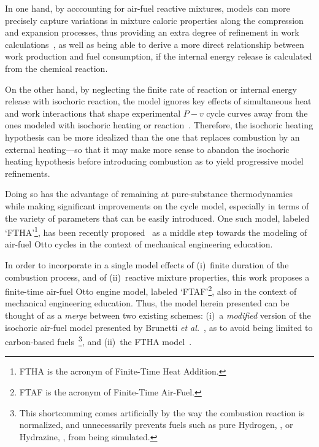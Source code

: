     In one hand, by acccounting for air-fuel reactive mixtures, models can more precisely capture variations in mixture  caloric
    properties along  the  compression  and  expansion  processes,  thus  providing  an  extra  degree  of  refinement  in  work
    calculations~\cite{2012-BrunettiF-Blucher}, as well as being  able  to  derive  a  more  direct  relationship  between  work
    production and fuel consumption, if the internal energy release is calculated from the chemical reaction.

    On the other hand, by neglecting the finite rate of reaction or internal energy release with isochoric reaction,  the  model
    ignores key effects of simultaneous heat and work interactions that shape experimental $P-v$ cycle curves away from the ones
    modeled with isochoric heating or reaction~\cite{2013-MartinsJJG-Publindustria}. Therefore, the isochoric heating hypothesis
    can be more idealized than the one that replaces combustion by an external heating---so that  it  may  make  more  sense  to
    abandon the isochoric heating hypothesis before introducing combustion as to yield progressive model refinements.

    Doing so has the advantage of remaining at pure-substance thermodynamics while making significant improvements on the  cycle
    model, especially in terms  of  the  variety  of  parameters  that  can  be  easily  introduced.  One  such  model,  labeled
    `FTHA'\footnote{FTHA    is     the     acronym     of     Finite-Time     Heat     Addition.},     has     been     recently
    proposed~\cite{2017-NaaktgeborenC-IntJMechEngEduc} as a middle step towards the modeling of  air-fuel  Otto  cycles  in  the
    context of mechanical engineering education.

    In order to incorporate in a single model effects of (i)~finite duration of the combustion  process,  and  of  (ii)~reactive
    mixture properties, this work proposes a finite-time air-fuel Otto engine model, labeled `FTAF'\footnote{FTAF is the acronym
    of Finite-Time Air-Fuel.}, also in the context of mechanical engineering education. Thus, the model herein presented can  be
    thought of as a \emph{merge} between two existing schemes: (i)~a \emph{modified} version of  the  isochoric  air-fuel  model
    presented  by  Brunetti  \emph{et  al.\/}~\cite{2012-BrunettiF-Blucher},  as  to  avoid  being   limited   to   carbon-based
    fuels~\footnote{This shortcomming comes artificially by the way the combustion reaction  is  normalized,  and  unnecessarily
    prevents fuels such as pure  Hydrogen,  ,  or  Hydrazine,  ,  from  being  simulated.},  and  (ii)~the  FTHA
    model~\cite{2017-NaaktgeborenC-IntJMechEngEduc}.

